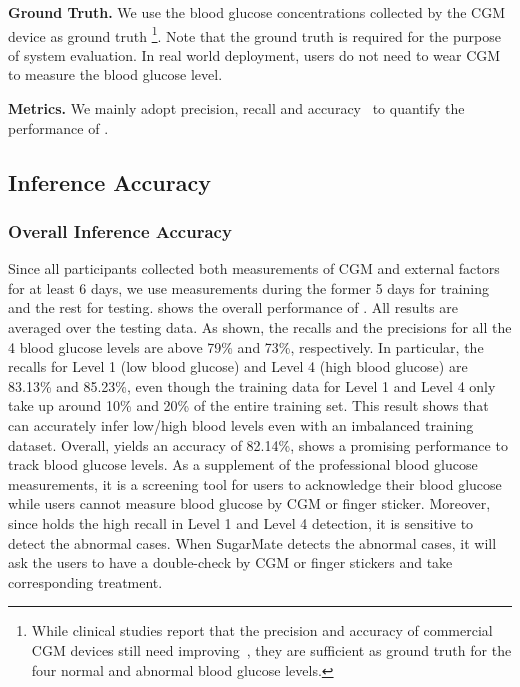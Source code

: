 \textbf{Ground Truth.}
We use the blood glucose concentrations collected by the CGM device as ground truth \footnote{While clinical studies report that the precision and accuracy of commercial CGM devices still need improving~\cite{bib:MEP08:Do, bib:JDST10:Vaddiraju}, they are sufficient as ground truth for the four normal and abnormal blood glucose levels.}. Note that the ground truth is required for the purpose of system evaluation. In real world deployment, users do not need to wear CGM to measure the blood glucose level.

\textbf{Metrics.}
We mainly adopt precision, recall and accuracy~\cite{prf1} to quantify the performance of \sysname.
%
%


\subsection{Inference Accuracy}
\subsubsection{Overall Inference Accuracy}
Since all participants collected both measurements of CGM and external factors for at least 6 days, we use measurements during the former 5 days for training and the rest for testing.
 shows the overall performance of \sysname.
All results are averaged over the testing data.
As shown, the recalls and the precisions for all the 4 blood glucose levels are above 79\% and 73\%, respectively.
In particular, the recalls for Level 1 (low blood glucose) and Level 4 (high blood glucose) are 83.13\% and 85.23\%, even though the training data for Level 1 and Level 4 only take up around 10\% and 20\% of the entire training set.
This result shows that \sysname can accurately infer low/high blood levels even with an imbalanced training dataset.
Overall, \sysname yields an accuracy of 82.14\%, shows a promising performance to track blood glucose levels. \textcolor[rgb]{1.00,0.00,0.00}{As a supplement of the professional blood glucose measurements, it is a screening tool for users to acknowledge their blood glucose while users cannot measure blood glucose by CGM or finger sticker. Moreover, since \sysname holds the high recall in Level 1 and Level 4 detection, it is sensitive to detect the abnormal cases. When SugarMate detects the abnormal cases, it will ask the users to have a double-check by CGM or finger stickers and take corresponding treatment.}

